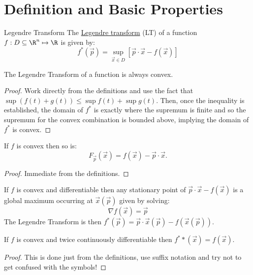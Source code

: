 \documentclass[../Main.tex]{subfiles}
\begin{document}
\section{Definition and Basic Properties}
\begin{definition}{Legendre Transform}
    The \underline{Legendre transform} (LT) of a function $f : D \subseteq \R^n \mapsto \R$ is given by:
    \begin{equation}
        f^*(\vec{p}) = \sup_{\vec{x} \in D} \left[\vec{p} \cdot \vec{x} - f(\vec{x})\right]
        \label{eqnLegendreTransform}
    \end{equation}
\end{definition}
\begin{proposition}
    The Legendre Transform of a function is always convex.
    \label{propLegendreConvex}
\end{proposition}
\begin{proof}
    Work directly from the definitions and use the fact that $\sup(f(t) + g(t)) \leq \sup f(t) + \sup g(t)$.
    Then, once the inequality is established, the domain of $f^*$ is exactly where the supremum is finite and so the supremum for the convex combination is bounded above, implying the domain of $f^*$ is convex.
\end{proof}
\begin{proposition}
    If $f$ is convex then so is:
    \begin{equation*}
        F_{\vec{p}}(\vec{x}) = f(\vec{x}) - \vec{p} \cdot \vec{x}.
    \end{equation*}
    \label{propLTArgConvex}
\end{proposition}
\begin{proof}
    Immediate from the definitions.
\end{proof}
\begin{corollary}
    If $f$ is convex and differentiable then any stationary point of $\vec{p} \cdot \vec{x} - f(\vec{x})$ is a global maximum occurring at $\vec{x}(\vec{p})$ given by solving:
    \begin{equation*}
        \nabla f(\vec{x}) = \vec{p}
    \end{equation*}
    The Legendre Transform is then $f^*(\vec{p}) = \vec{p} \cdot \vec{x}(\vec{p}) - f(\vec{x}(\vec{p}))$.
    \label{corLTStationary}
\end{corollary}
\begin{theorem}
    If $f$ is convex and twice continuously differentiable then $f^**(\vec{x}) = f(\vec{x})$.
    \label{thmLTSelfInverse}
\end{theorem}
\begin{proof}
    This is done just from the definitions, use suffix notation and try not to get confused with the symbols!
\end{proof}
\end{document}
